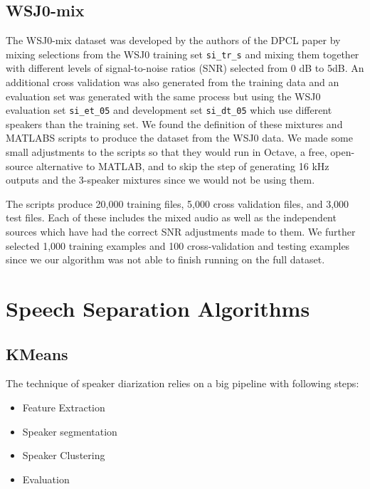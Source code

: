 \documentclass[journal, a4paper]{IEEEtran}
\begin{document}
\subsection{WSJ0-mix}
The WSJ0-mix dataset was developed by the authors of the DPCL \cite{DBLP:journals/corr/HersheyCRW15} paper by mixing selections from the WSJ0 training set \texttt{si\_tr\_s} and mixing them together with different levels of signal-to-noise ratios (SNR) selected from 0 dB to 5dB. An additional cross validation was also generated from the training data and an evaluation set was generated with the same process but using the WSJ0 evaluation set \texttt{si\_et\_05} and development set \texttt{si\_dt\_05} which use different speakers than the training set. We found the definition of these mixtures and MATLABS scripts \cite{WSJmix} to produce the dataset from the WSJ0 data. We made some small adjustments to the scripts so that they would run in Octave, a free, open-source alternative to MATLAB, and to skip the step of generating 16 kHz outputs and the 3-speaker mixtures since we would not be using them.

The scripts produce 20,000 training files, 5,000 cross validation files, and 3,000 test files. Each of these includes the mixed audio as well as the independent sources which have had the correct SNR adjustments made to them. We further selected 1,000 training examples and 100 cross-validation and testing examples since we our algorithm was not able to finish running on the full dataset.


\section{Speech Separation Algorithms}
\subsection{KMeans}
The technique of speaker diarization relies on a big pipeline with following steps:
\begin{itemize}
    \item Feature Extraction
    \item Speaker segmentation
    \item Speaker Clustering
    \item Evaluation
\end{itemize}
\end{document}
